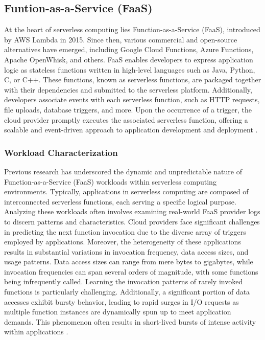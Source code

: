 \subsection{Funtion-as-a-Service (FaaS)}
At the heart of serverless computing lies Function-as-a-Service (FaaS), introduced by AWS Lambda in 2015. Since then, various commercial and open-source alternatives have emerged, including Google Cloud Functions, Azure Functions, Apache OpenWhisk, and others. FaaS enables developers to express application logic as stateless functions written in high-level languages such as Java, Python, C, or C++. These functions, known as serverless functions, are packaged together with their dependencies and submitted to the serverless platform. Additionally, developers associate events with each serverless function, such as HTTP requests, file uploads, database triggers, and more. Upon the occurrence of a trigger, the cloud provider promptly executes the associated serverless function, offering a scalable and event-driven approach to application development and deployment \cite{AWSLambd40:online,AzureFun49:online,CloudFun3:online,ApacheOp28:online}.

\subsubsection*{Workload Characterization}
Previous research has underscored the dynamic and unpredictable nature of Function-as-a-Service (FaaS) workloads within serverless computing environments. Typically, applications in serverless computing are composed of interconnected serverless functions, each serving a specific logical purpose. Analyzing these workloads often involves examining real-world FaaS provider logs to discern patterns and characteristics. Cloud providers face significant challenges in predicting the next function invocation due to the diverse array of triggers employed by applications. Moreover, the heterogeneity of these applications results in substantial variations in invocation frequency, data access sizes, and usage patterns. Data access sizes can range from mere bytes to gigabytes, while invocation frequencies can span several orders of magnitude, with some functions being infrequently called. Learning the invocation patterns of rarely invoked functions is particularly challenging. Additionally, a significant portion of data accesses exhibit bursty behavior, leading to rapid surges in I/O requests as multiple function instances are dynamically spun up to meet application demands. This phenomenon often results in short-lived bursts of intense activity within applications \cite{shahrad2020serverless,romero2021faat,klimovic2018pocket}.

